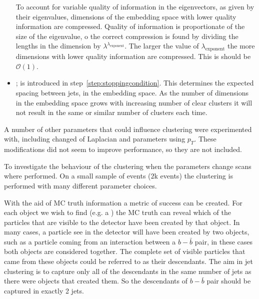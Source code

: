 \begin{itemize}
           To account for variable quality of information in the eigenvectors, as given by their eigenvalues,
        dimensions of the embedding space with lower quality information are compressed.
        Quality of information is proportionate of the size of the eigenvalue, o the correct compression is found by
        dividing the lengths in the dimension by \(\lambda^{\lambda_\text{exponent}}\).
        The larger the value of \(\lambda_\text{exponent}\) the more dimensions with lower quality information are compressed.
        This is should be \(\mathcal{O}(1)\).
    \item \stoppingdeltar{}; is introduced in step~\ref{step:stoppingcondition}.
         This determines the expected spacing between jets, in the embedding space.
         As the number of dimensions in the embedding space grows with increasing 
         number of clear clusters it will not result in the same or
         similar number of clusters each time.

\end{itemize}


A number of other parameters that could influence clustering were experimented with,
including changed of Laplacian and parameters using \(p_T\).
These modifications did not seem to improve performance, so they are not included.

To investigate the behaviour of the clustering when the parameters change scans where performed.
On a small sample of events (\(2\)k events) the clustering is performed with many different parameter choices.

With the aid of MC truth information a metric of success can be created.
For each object we wish to find (e.g. a ) 
the MC truth can reveal which of the particles that are visible to the detector have
been created by that object.
In many cases, a particle see in the detector will have been created by two objects,
such as a particle coming from an interaction between a \(b-\bar{b}\) pair,
in these cases both objects are considered together.
The complete set of visible particles that came from these objects could be referred to as their descendants.
The aim in jet clustering is to capture only all of the descendants in the same number of jets as there were objects that created them.
So the descendants of \(b-\bar{b}\) pair should be captured in exactly 2 jets.

